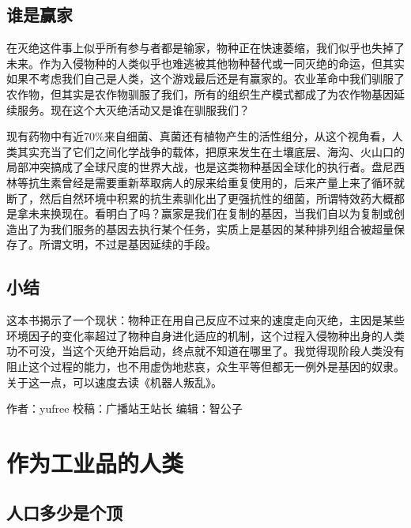 \documentclass[
]{book}
\begin{document}
\hypertarget{ux8c01ux662fux8d62ux5bb6}{%
\subsection{谁是赢家}\label{ux8c01ux662fux8d62ux5bb6}}

在灭绝这件事上似乎所有参与者都是输家，物种正在快速萎缩，我们似乎也失掉了未来。作为入侵物种的人类似乎也难逃被其他物种替代或一同灭绝的命运，但其实如果不考虑我们自己是人类，这个游戏最后还是有赢家的。农业革命中我们驯服了农作物，但其实是农作物驯服了我们，所有的组织生产模式都成了为农作物基因延续服务。现在这个大灭绝活动又是谁在驯服我们？

现有药物中有近70\%来自细菌、真菌还有植物产生的活性组分，从这个视角看，人类其实充当了它们之间化学战争的载体，把原来发生在土壤底层、海沟、火山口的局部冲突搞成了全球尺度的世界大战，也是这类物种基因全球化的执行者。盘尼西林等抗生素曾经是需要重新萃取病人的尿来给重复使用的，后来产量上来了循环就断了，然后自然环境中积累的抗生素驯化出了更强抗性的细菌，所谓特效药大概都是拿未来换现在。看明白了吗？赢家是我们在复制的基因，当我们自以为复制或创造出了为我们服务的基因去执行某个任务，实质上是基因的某种排列组合被超量保存了。所谓文明，不过是基因延续的手段。

\hypertarget{ux5c0fux7ed3-2}{%
\subsection{小结}\label{ux5c0fux7ed3-2}}

这本书揭示了一个现状：物种正在用自己反应不过来的速度走向灭绝，主因是某些环境因子的变化率超过了物种自身进化适应的机制，这个过程入侵物种出身的人类功不可没，当这个灭绝开始启动，终点就不知道在哪里了。我觉得现阶段人类没有阻止这个过程的能力，也不用虚伪地悲哀，众生平等但都无一例外是基因的奴隶。关于这一点，可以速度去读《机器人叛乱》。

作者：yufree
校稿：广播站王站长
编辑：智公子

\hypertarget{ux4f5cux4e3aux5de5ux4e1aux54c1ux7684ux4ebaux7c7b}{%
\section{作为工业品的人类}\label{ux4f5cux4e3aux5de5ux4e1aux54c1ux7684ux4ebaux7c7b}}

\hypertarget{ux4ebaux53e3ux591aux5c11ux662fux4e2aux9876}{%
\subsection{人口多少是个顶}\label{ux4ebaux53e3ux591aux5c11ux662fux4e2aux9876}}
\end{document}
